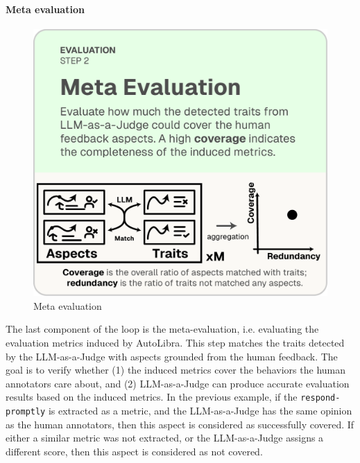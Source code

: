 \paragraph{Meta evaluation}
\begin{figure}
  \vspace{-15pt}
  \includegraphics[width=\linewidth]{figs/autolibra_step_4.pdf}
  \vspace{-10pt}
  \caption{\small Meta evaluation}
  \label{fig:meta_evaluation}
\end{figure}
The last component of the loop is the meta-evaluation, i.e. evaluating the evaluation metrics induced by AutoLibra.
This step matches the traits detected by the LLM-as-a-Judge with aspects
grounded from the human feedback. The goal is to verify whether (1) the induced metrics cover the behaviors the human annotators care about, and (2) LLM-as-a-Judge can produce
accurate evaluation results based on the induced metrics. In the previous example,
if the \texttt{respond-promptly} is extracted as a metric, and the LLM-as-a-Judge
has the same opinion as the human annotators, then this aspect is considered as successfully covered.
If either a similar metric was not extracted, or the LLM-as-a-Judge assigns a different score,
then this aspect is considered as not covered.



